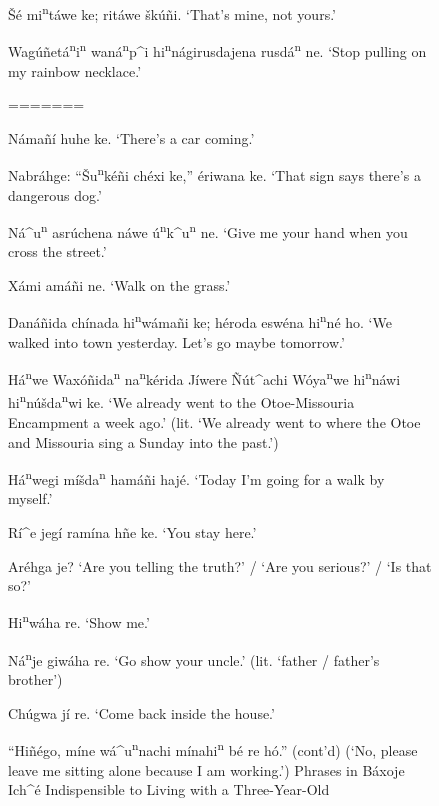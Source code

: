 \documentclass[output=paper]{LSP/langsci}
\begin{document}
\begin{figure}[p]
\begin{list}{}{}
\item{\v{S}\'e mi\textsuperscript{n}táwe ke;  ritáwe \v{s}k\'uñi. `That's mine, not yours.'}
\item{Wag\'uñetá\textsuperscript{n}i\textsuperscript{n} waná\textsuperscript{n}p\^{ }i hi\textsuperscript{n}nágirusdajena rusdá\textsuperscript{n} ne. `Stop pulling on my rainbow necklace.'}
\end{list} 
\caption{``Hiñ\'ego, míne wá\^{ }u\textsuperscript{n}nachi mínahi\textsuperscript{n} b\'e re hó.'' (cont'd)\newline
(`No, please leave me sitting alone because I am working.')\newline
Phrases in Báxoje Ich\^{ }\'e Indispensible to Living with a Three-Year-Old}
=======
\item{N\'ama\~n\'i huhe ke. `There's a car coming.'}
\item{Nabr\'ahge: ``\v{S}u\textsuperscript{n}k\'e\~ni ch\'exi ke,'' \'eriwana ke. `That sign says there's a dangerous dog.'}
\item{N\'a\^{ }u\textsuperscript{n} asr\'uchena n\'awe \'u\textsuperscript{n}k\^{ }u\textsuperscript{n} ne. `Give me your hand when you cross the street.'}
\item{X\'ami am\'a\~ni ne. `Walk on the grass.'}
\item{Dan\'a\~nida ch\'inada hi\textsuperscript{n}w\'ama\~ni ke; h\'eroda esw\'ena hi\textsuperscript{n}n\'e ho. `We walked into town yesterday. Let's go maybe tomorrow.'}
\item{H\'a\textsuperscript{n}we Wax\'o\~nida\textsuperscript{n} na\textsuperscript{n}k\'erida J\'iwere \~N\'ut\^{ }achi W\'oya\textsuperscript{n}we hi\textsuperscript{n}náwi hi\textsuperscript{n}n\'u\v{s}da\textsuperscript{n}wi ke. `We already went to the Otoe-Missouria Encampment a week ago.' (lit. `We already went to where the Otoe and Missouria sing a Sunday into the past.')}
\item{H\'a\textsuperscript{n}wegi m\'i\v{s}da\textsuperscript{n} ham\'a\~ni haj\'e.  `Today I'm going for a walk by myself.'}
\item{R\'i\^{ }e jeg\'i ram\'ina h\~ne ke. `You stay here.'}
\item{Ar\'ehga je? `Are you telling the truth?' / `Are you serious?' / `Is that so?'}
\item{Hi\textsuperscript{n}w\'aha re. `Show me.'}
\item{N\'a\textsuperscript{n}je giw\'aha re. `Go show your uncle.' (lit. `father / father's brother')}
\item{Ch\'ugwa jí re.	`Come back inside the house.'}

\end{figure}
\end{document}
